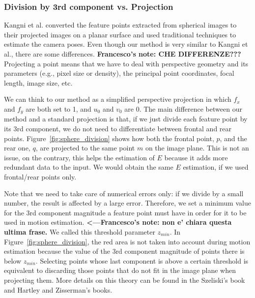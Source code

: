 \subsubsection{Division by 3rd component vs. Projection}
%
Kangni et al.\cite{kangni2007orientation} converted the 
feature points extracted from spherical images to their projected images on a 
planar surface and used traditional techniques to estimate the camera poses.
%
Even though our method is very similar to Kangni et al., there are some differences.
\textbf{Francesco's note: CHE DIFFERENZE???}
Projecting a point means that we have to deal with perspective geometry and its
parameters (e.g., pixel size or density), the principal point coordinates, 
focal length, image size, etc.

We can think to our method as a simplified perspective projection in which
$f_x$ and $f_y$ are both set to 1, and $u_0$ and $v_0$ are 0.
The main difference between our method and a standard projection is that, if we
just divide each feature point by its 3rd component, we do not need to 
differentiate between frontal and rear points.
Figure~\ref{fig:sphere_division} shows how both the frontal point, $p$, and the 
rear one, $q$, are projected to the same point $m$ on the image plane.
This is not an issue, on the contrary, this helps the estimation of $E$ because 
it adds more redundant data to the input. We would obtain the
same $E$ estimation, if we used frontal/rear points only.

Note that we need to take care of numerical errors only: if we divide by a 
small number, the result is affected by a large error. Therefore, we
set a minimum value for the 3rd component magnitude a feature point must 
have in order for it to be used in motion estimation. \textbf{<---Francesco's note: non e' chiara questa ultima frase.}
%
We called this threshold parameter $z_{min}$.
In Figure~\ref{fig:sphere_division}, the red area is not taken into account 
during motion estimation because the value of the 3rd component magnitude of points there 
is below $z_{min}$.
%
Selecting points whose last component is above a certain threshold is 
equivalent to discarding those points that do not fit in the image plane
when projecting them. More details on this theory can be found in the Szeliski's book\cite{szeliski2010computer} and Hartley and Zisserman's books\cite{Hartley2004}.

